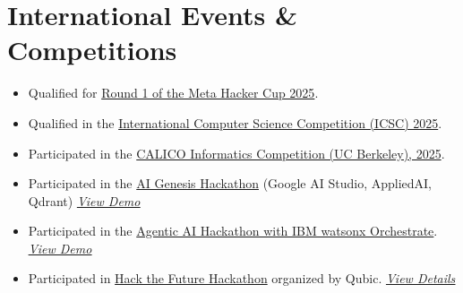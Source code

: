 \documentclass[a4paper,12pt]{article}
\begin{document}
\section{International Events \& Competitions}
\begin{itemize}
    \item Qualified for \href{https://www.facebook.com/codingcompetitions/hacker-cup/2025/certificate/1142880171157242}{Round 1 of the Meta Hacker Cup 2025}.
    \item Qualified in the \href{https://icscompetition.org/c/Certificate-QR-2025-FFB74B80AA6-94ee910f6d161e712e70cca319d93761.pdf}{International Computer Science Competition (ICSC) 2025}.
    \item Participated in the \href{https://www.linkedin.com/posts/aahmedfaraz_learning-growthmindset-failuretosuccess-activity-7399509376488615936-rtZd?utm_source=share&utm_medium=member_desktop&rcm=ACoAADdJH-cBzPnm9JIV3RhrpK_TvX28bFX_rEY}{CALICO Informatics Competition (UC Berkeley), 2025}.
    \item Participated in the \href{https://lablab.ai/u/@ahmed_faraz702/cmi68u64000fg6z0sucqab7az}{AI Genesis Hackathon} (Google AI Studio, AppliedAI, Qdrant)
    \hfill \textit{\href{https://www.linkedin.com/posts/aahmedfaraz_hackathon-ai-electron-activity-7397141415165726720-tlQq?utm_source=share&utm_medium=member_desktop&rcm=ACoAADdJH-cBzPnm9JIV3RhrpK_TvX28bFX_rEY}{\faLink \underline{View Demo}}}
    \item Participated in the \href{https://lablab.ai/u/@ahmed_faraz702/cmit0n778002nda0s8fmq2rur}{Agentic AI Hackathon with IBM watsonx Orchestrate}.
    \hfill \textit{\href{https://www.linkedin.com/posts/aahmedfaraz_ibm-watsonx-agenticai-activity-7403253209386979328-dxEk?utm_source=share&utm_medium=member_desktop&rcm=ACoAADdJH-cBzPnm9JIV3RhrpK_TvX28bFX_rEY}{\faLink \underline{View Demo}}}
    \item Participated in \href{https://lablab.ai/u/@ahmed_faraz702/event/qubic-hack-the-future/certificate}{Hack the Future Hackathon} organized by Qubic.
    \hfill \textit{\href{https://www.linkedin.com/posts/aahmedfaraz_qubic-lablabai-blockchain-activity-7403681197790408704-Aq7n?utm_source=share&utm_medium=member_desktop&rcm=ACoAADdJH-cBzPnm9JIV3RhrpK_TvX28bFX_rEY}{\faLink \underline{View Details}}}
\end{itemize}
\end{document}
